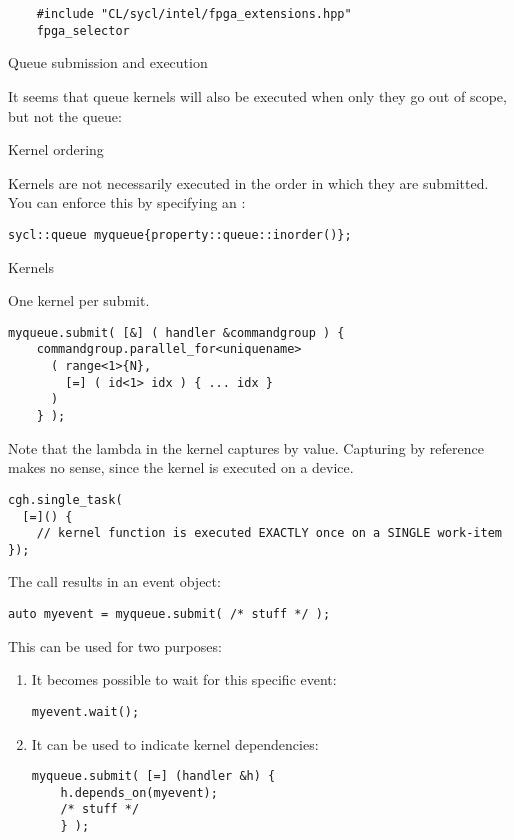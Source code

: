 \begin{dpcppnote}
  \begin{lstlisting}
    #include "CL/sycl/intel/fpga_extensions.hpp"
    fpga_selector
  \end{lstlisting}
\end{dpcppnote}

 {Queue submission and execution}

It seems that queue kernels will also be executed when only they
go out of scope, but not the queue:
%

 {Kernel ordering}

Kernels are not necessarily executed in the order in which they are submitted.
You can enforce this by specifying an :
\begin{lstlisting}
sycl::queue myqueue{property::queue::inorder()};
\end{lstlisting}

 {Kernels}

One kernel per submit.

\begin{lstlisting}
myqueue.submit( [&] ( handler &commandgroup ) {
    commandgroup.parallel_for<uniquename> 
      ( range<1>{N},
        [=] ( id<1> idx ) { ... idx }
      )
    } );
\end{lstlisting}

Note that the lambda in the kernel captures by value.
Capturing by reference makes no sense,
since the kernel is executed on a device.

\begin{lstlisting}
cgh.single_task(
  [=]() {
    // kernel function is executed EXACTLY once on a SINGLE work-item
});
\end{lstlisting}

The  call results in an event object:
\begin{lstlisting}
auto myevent = myqueue.submit( /* stuff */ );
\end{lstlisting}
This can be used for two purposes:
\begin{enumerate}
\item It becomes possible to wait for this specific event:
\begin{lstlisting}
myevent.wait();    
\end{lstlisting}
\item It can be used to indicate kernel dependencies:
\begin{lstlisting}
myqueue.submit( [=] (handler &h) {
    h.depends_on(myevent);
    /* stuff */
    } );
\end{lstlisting}
\end{enumerate}

